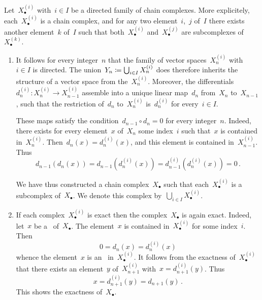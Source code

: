 \begin{recall}
  Let~$X^{(i)}_\bullet$ with~$i \in I$ be a directed family of chain complexes.
  More explicitely, each~$X^{(i)}_\bullet$ is a chain complex, and for any two element~$i$,~$j$ of~$I$ there exists another element~$k$ of~$I$ such that both~$X^{(i)}_\bullet$ and~$X^{(j)}_\bullet$ are subcomplexes of~$X^{(k)}_\bullet$.
  \begin{enumerate}
    \item
      It follows for every integer~$n$ that the family of vector spaces~$X^{(i)}_n$ with~$i \in I$ is directed.
      The union~$Y_n \coloneqq \bigcup_{i \in I} X^{(i)}_n$ does therefore inherits the structure of a vector space from the~$X^{(i)}_n$.
      Moreover, the differentials~$d^{(i)}_n \colon X^{(i)}_n \to X^{(i)}_{n-1}$ assemble into a unique linear map~$d_n$ from~$X_n$ to~$X_{n-1}$, such that the restriction of~$d_n$ to~$X^{(i)}_n$ is~$d^{(i)}_n$ for every~$i \in I$.
      
      These maps satisfy the condition~$d_{n-1} \circ d_n = 0$ for every integer~$n$.
      Indeed, there exists for every element~$x$ of~$X_n$ some index~$i$ such that~$x$ is contained in~$X^{(i)}_n$.
      Then~$d_n(x) = d^{(i)}_n(x)$, and this element is contained in~$X^{(i)}_{n-1}$.
      Thus
      \[
        d_{n-1}( d_n( x ) )
        =
        d_{n-1}( d^{(i)}_n( x ) )
        =
        d^{(i)}_{n-1}( d^{(i)}_n( x ) )
        =
        0 \,.
      \]

      We have thus constructed a chain complex~$X_{\bullet}$ such that each~$X^{(i)}_\bullet$ is a subcomplex of~$X_\bullet$.
      We denote this complex by~$\bigcup_{i \in I} X^{(i)}_\bullet$.
    \item
      If each complex~$X^{(i)}_\bullet$ is exact then the complex~$X_\bullet$ is again exact.
      Indeed, let~$x$ be a~ of~$X_\bullet$.
      The element~$x$ is contained in~$X^{(i)}_\bullet$ for some index~$i$.
      Then
      \[
        0
        =
        d_n(x)
        =
        d^{(i)}_n(x)
      \]
      whence the element~$x$ is an~ in~$X^{(i)}_\bullet$.
      It follows from the exactness of~$X^{(i)}_\bullet$ that there exists an element~$y$ of~$X^{(i)}_{n+1}$ with~$x = d^{(i)}_{n+1}(y)$.
      Thus
      \[
        x
        =
        d^{(i)}_{n+1}( y )
        =
        d_{n+1}(y) \,.
      \]
      This shows the exactness of~$X_\bullet$.
  \end{enumerate}
\end{recall}


